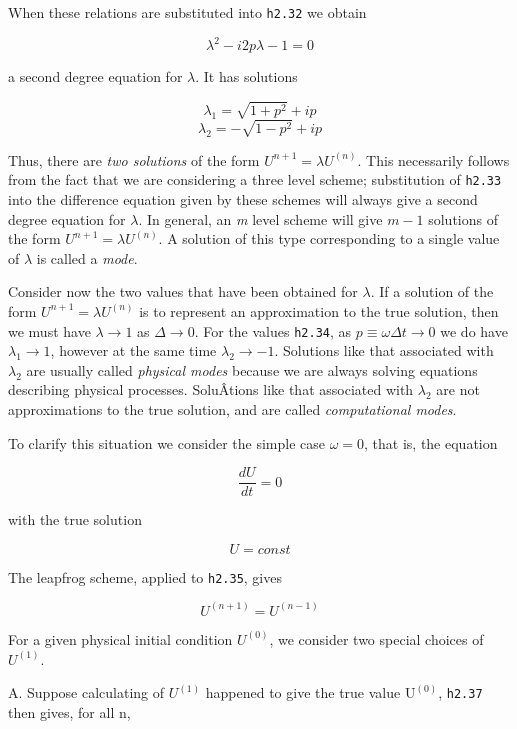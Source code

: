 When these relations are substituted into \texttt{h2.32} we obtain

\[\lambda^{2} - i2p\lambda - 1 = 0\]

a second degree equation for \(\lambda\). It has solutions

\[\lambda_{1} = \sqrt{1 + p^{2}} + i p\]\[\lambda_{2} = - \sqrt{1 - p^{2}} + i p\]

Thus, there are \emph{two solutions} of the form
\(U^{n + 1} = \lambda U^{( n )}\). This necessarily follows from the
fact that we are considering a three level scheme; substitution of
\texttt{h2.33} into the difference equation given by these schemes will
always give a second degree equation for \(\lambda\). In general, an
\emph{m} level scheme will give $m-1$ solutions of the form
\(U^{n + 1} = \lambda U^{\left( n \right)}\). A solution of this type
corresponding to a single value of \(\lambda\) is called a \emph{mode}.

Consider now the two values that have been obtained for \(\lambda\). If
a solution of the form \(U^{n + 1} = \lambda U^{\left( n \right)}\) is
to represent an approximation to the true solution, then we must have
\(\lambda \rightarrow 1\) as \(\Delta \rightarrow 0\). For the values
\texttt{h2.34}, as \(p \equiv \omega\Delta t \rightarrow 0\) we do have
\(\lambda_{1} \rightarrow 1\), however at the same time
\(\lambda_{2} \rightarrow - 1\). Solutions like that associated with
\(\lambda_{2}\) are usually called \emph{physical modes} because we are
always solving equations describing physical processes. SoluÂ­tions like
that associated with \(\lambda_2\) are not approximations to the true
solution, and are called \emph{computational modes}.

To clarify this situation we consider the simple case \(\omega = 0\),
that is, the equation

\[\frac{d U}{d t} = 0\]

with the true solution

\[U = const\]

The leapfrog scheme, applied to \texttt{h2.35}, gives

\[U^{\left( n + 1 \right)} = U^{\left( n - 1 \right)}\]

For a given physical initial condition \(U^{\left( 0 \right)}\), we
consider two special choices of \(U^{\left( 1 \right)}\).

A. Suppose calculating of \(U^{\left( 1 \right)}\) happened to give the
true value \(\text{U}^{\left( 0 \right)}\), \texttt{h2.37} then gives,
for all n,

